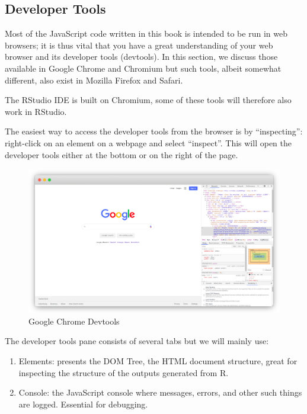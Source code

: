 \documentclass[
]{krantz}
\makeatletter
\providecommand{\tightlist}{%
  \setlength{\itemsep}{0pt}\setlength{\parskip}{0pt}}
\newenvironment{kframe}{%
\medskip{}
\setlength{\fboxsep}{.8em}
 \def\at@end@of@kframe{}%
 \ifinner\ifhmode%
  \def\at@end@of@kframe{\end{minipage}}%
  \begin{minipage}{\columnwidth}%
 \fi\fi%
 \def\FrameCommand##1{\hskip\@totalleftmargin \hskip-\fboxsep
 \colorbox{shadecolor}{##1}\hskip-\fboxsep
     \hskip-\linewidth \hskip-\@totalleftmargin \hskip\columnwidth}%
 \MakeFramed {\advance\hsize-\width
   \@totalleftmargin\z@ \linewidth\hsize
   \@setminipage}}%
 {\par\unskip\endMakeFramed%
 \at@end@of@kframe}
\newenvironment{rmdblock}[1]
  {
  \begin{itemize}
  \renewcommand{\labelitemi}{
    \raisebox{-.7\height}[0pt][0pt]{
      {\setkeys{Gin}{width=3em,keepaspectratio}\texttt{[image: images/\#1]}}
    }
  }
  \setlength{\fboxsep}{1em}
  \begin{kframe}
  \item
  }
  {
  \end{kframe}
  \end{itemize}
  }
\newenvironment{rmdnote}
  {\begin{rmdblock}{note}}
  {\end{rmdblock}}
\makeatother
\begin{document}
\hypertarget{basics-chrome-devtools}{%
\subsection{Developer Tools}\label{basics-chrome-devtools}}

Most of the JavaScript code written in this book is intended to be run in web browsers; it is thus vital that you have a great understanding of your web browser and its developer tools (devtools). In this section, we discuss those available in Google Chrome and Chromium but such tools, albeit somewhat different, also exist in Mozilla Firefox and Safari.

\begin{rmdnote}
The RStudio IDE is built on Chromium, some of these tools will therefore
also work in RStudio.
\end{rmdnote}

The easiest way to access the developer tools from the browser is by ``inspecting'': right-click on an element on a webpage and select ``inspect''. This will open the developer tools either at the bottom or on the right of the page.

\begin{figure}[t]

{\centering \includegraphics[width=1\linewidth]{images/devtools} 

}

\caption{Google Chrome Devtools}\label{fig:chrome-devtools}
\end{figure}

The developer tools pane consists of several tabs but we will mainly use:

\begin{enumerate}
\def\labelenumi{\arabic{enumi}.}
\tightlist
\item
  Elements: presents the DOM Tree, the HTML document structure, great for inspecting the structure of the outputs generated from R.
\item
  Console: the JavaScript console where messages, errors, and other such things are logged. Essential for debugging.
\end{enumerate}
\end{document}

